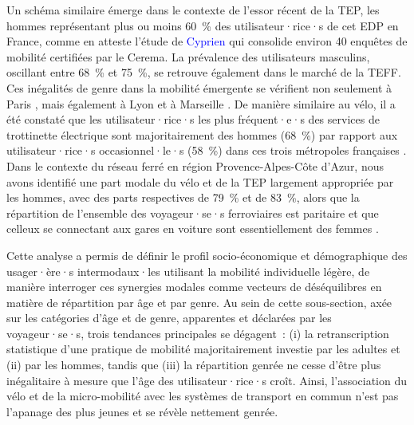 \begin{refsegment}
Un schéma similaire émerge dans le contexte de l'essor récent de la \acrshort{TEP}, les hommes représentant plus ou moins 60~\% des utilisateur·rice·s de cet \acrshort{EDP} en France, comme en atteste l'étude de \textcolor{blue}{Cyprien} \textcolor{blue}{\textcite{richer_dossier_2021}} qui consolide environ 40 enquêtes de mobilité certifiées par le \acrfull{Cerema}. La prévalence des utilisateurs masculins, oscillant entre 68~\% et 75~\%, se retrouve également dans le marché de la \acrshort{TEFF}. Ces inégalités de genre dans la mobilité émergente se vérifient non seulement à Paris \textcolor{blue}{\autocites[46]{apur_mobilites_2020}[14]{6t-bureau_de_recherche_comprendre_2019}[annexes]{bortoli_consequential_2020}}, mais également à Lyon et à Marseille \textcolor{blue}{\autocite[50]{6t-bureau_de_recherche_usages_2019}}. De manière similaire au vélo, il a été constaté que les utilisateur·rice·s les plus fréquent·e·s des services de trottinette électrique sont majoritairement des hommes (68~\%) par rapport aux utilisateur·rice·s occasionnel·le·s (58~\%) dans ces trois métropoles françaises \textcolor{blue}{\autocite[65]{6t-bureau_de_recherche_usages_2019}}. Dans le contexte du réseau ferré en région Provence-Alpes-Côte d'Azur, nous avons identifié une part modale du vélo et de la \acrshort{TEP} largement appropriée par les hommes, avec des parts respectives de 79~\% et de 83~\%, alors que la répartition de l'ensemble des voyageur·se·s ferroviaires est paritaire et que celleux se connectant aux gares en voiture sont essentiellement des femmes \textcolor{blue}{\autocite[183]{moinse_intermodal_2022}}.%

Cette analyse a permis de définir le profil socio-économique et démographique des usager·ère·s intermodaux·les utilisant la mobilité individuelle légère, de manière interroger ces synergies modales comme vecteurs de déséquilibres en matière de répartition par âge et par genre. Au sein de cette sous-section, axée sur les catégories d'âge et de genre, apparentes et déclarées par les voyageur·se·s, trois tendances principales se dégagent~: (i) la retranscription statistique d'une pratique de mobilité majoritairement investie par les adultes et (ii) par les hommes, tandis que (iii) la répartition genrée ne cesse d'être plus inégalitaire à mesure que l'âge des utilisateur·rice·s croît. Ainsi, l'association du vélo et de la micro-mobilité avec les systèmes de transport en commun n'est pas l'apanage des plus jeunes et se révèle nettement genrée.%


\end{refsegment}
